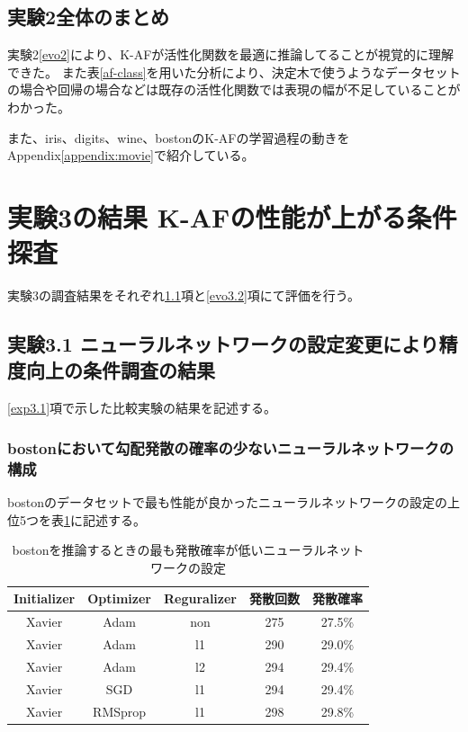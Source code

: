\subsection{実験2全体のまとめ}
実験2\ref{evo2}により、K-AFが活性化関数を最適に推論してることが視覚的に理解できた。
また表\ref{af-class}を用いた分析により、決定木で使うようなデータセットの場合や回帰の場合などは既存の活性化関数では表現の幅が不足していることがわかった。

また、iris、digits、wine、bostonのK-AFの学習過程の動きをAppendix\ref{appendix:movie}で紹介している。









\section{実験3の結果 K-AFの性能が上がる条件探査}
\label{evo3}
実験3の調査結果をそれぞれ\ref{evo3.1}項と\ref{evo3.2}項にて評価を行う。


\subsection{実験3.1 ニューラルネットワークの設定変更により精度向上の条件調査の結果}
\label{evo3.1}
\ref{exp3.1}項で示した比較実験の結果を記述する。


\subsubsection{bostonにおいて勾配発散の確率の少ないニューラルネットワークの構成}
bostonのデータセットで最も性能が良かったニューラルネットワークの設定の上位5つを表\ref{bostonbest}に記述する。


\begin{table}[htbp]
    \begin{center}
        \caption{bostonを推論するときの最も発散確率が低いニューラルネットワークの設定}
        \label{bostonbest}
        \vspace{2mm} 
        \begin{tabular}{ |c|c|c|c|c| }
        \hline
        Initializer & Optimizer &  Reguralizer & 発散回数 & 発散確率 \\
        \hline
        Xavier & Adam & non & 275 & 27.5\%　\\
        \hline
        Xavier & Adam & l1 & 290 & 29.0\%　\\
        \hline
        Xavier & Adam & l2 & 294 & 29.4\%　\\
        \hline
        Xavier & SGD & l1 & 294 & 29.4\%　\\
        \hline
        Xavier & RMSprop & l1 & 298 & 29.8\%　\\
        \hline
        \end{tabular}
    \end{center}
\end{table}


